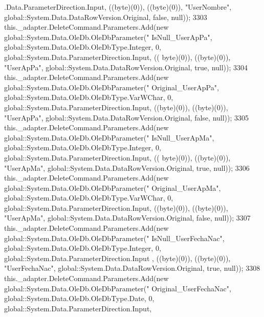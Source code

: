 \begin{DoxyCode}
      .Data.ParameterDirection.Input, ((byte)(0)), ((byte)(0)), \textcolor{stringliteral}{"UserNombre"}, global::System.Data.DataRowVersion.Original, \textcolor{keyword}{false}, null));
3303             this.\_adapter.DeleteCommand.Parameters.Add(\textcolor{keyword}{new} global::System.Data.OleDb.OleDbParameter(\textcolor{stringliteral}{"
      IsNull\_UserApPa"}, global::System.Data.OleDb.OleDbType.Integer, 0, global::System.Data.ParameterDirection.Input, ((
      byte)(0)), ((byte)(0)), \textcolor{stringliteral}{"UserApPa"}, global::System.Data.DataRowVersion.Original, \textcolor{keyword}{true}, null));
3304             this.\_adapter.DeleteCommand.Parameters.Add(\textcolor{keyword}{new} global::System.Data.OleDb.OleDbParameter(\textcolor{stringliteral}{"
      Original\_UserApPa"}, global::System.Data.OleDb.OleDbType.VarWChar, 0, global::System.Data.ParameterDirection.Input,
       ((byte)(0)), ((byte)(0)), \textcolor{stringliteral}{"UserApPa"}, global::System.Data.DataRowVersion.Original, \textcolor{keyword}{false}, null));
3305             this.\_adapter.DeleteCommand.Parameters.Add(\textcolor{keyword}{new} global::System.Data.OleDb.OleDbParameter(\textcolor{stringliteral}{"
      IsNull\_UserApMa"}, global::System.Data.OleDb.OleDbType.Integer, 0, global::System.Data.ParameterDirection.Input, ((
      byte)(0)), ((byte)(0)), \textcolor{stringliteral}{"UserApMa"}, global::System.Data.DataRowVersion.Original, \textcolor{keyword}{true}, null));
3306             this.\_adapter.DeleteCommand.Parameters.Add(\textcolor{keyword}{new} global::System.Data.OleDb.OleDbParameter(\textcolor{stringliteral}{"
      Original\_UserApMa"}, global::System.Data.OleDb.OleDbType.VarWChar, 0, global::System.Data.ParameterDirection.Input,
       ((byte)(0)), ((byte)(0)), \textcolor{stringliteral}{"UserApMa"}, global::System.Data.DataRowVersion.Original, \textcolor{keyword}{false}, null));
3307             this.\_adapter.DeleteCommand.Parameters.Add(\textcolor{keyword}{new} global::System.Data.OleDb.OleDbParameter(\textcolor{stringliteral}{"
      IsNull\_UserFechaNac"}, global::System.Data.OleDb.OleDbType.Integer, 0, global::System.Data.ParameterDirection.Input
      , ((byte)(0)), ((byte)(0)), \textcolor{stringliteral}{"UserFechaNac"}, global::System.Data.DataRowVersion.Original, \textcolor{keyword}{true}, null));
3308             this.\_adapter.DeleteCommand.Parameters.Add(\textcolor{keyword}{new} global::System.Data.OleDb.OleDbParameter(\textcolor{stringliteral}{"
      Original\_UserFechaNac"}, global::System.Data.OleDb.OleDbType.Date, 0, global::System.Data.ParameterDirection.Input,

\end{DoxyCode}
